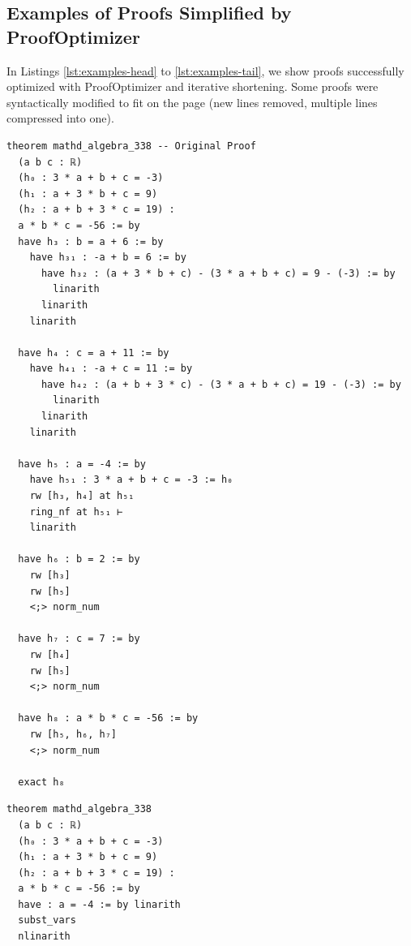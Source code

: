 \vfill


\newpage
\subsection{Examples of Proofs Simplified by ProofOptimizer}

In Listings \ref{lst:examples-head} to \ref{lst:examples-tail}, we show proofs successfully optimized with ProofOptimizer and iterative shortening. Some proofs were syntactically modified to fit on the page (new lines removed, multiple lines compressed into one).

\begin{tcolorbox}[colback=lightblue, boxrule=0pt, arc=5pt, outer arc=5pt, after skip=10pt plus 2pt]
\begin{minipage}[t]{0.48\textwidth}
\begin{lstlisting}[caption={Original Proof (Length 214)},label={lst:examples-head}, language=lean, breaklines=true, style=mystyle]
theorem mathd_algebra_338 -- Original Proof
  (a b c : ℝ)
  (h₀ : 3 * a + b + c = -3)
  (h₁ : a + 3 * b + c = 9)
  (h₂ : a + b + 3 * c = 19) :
  a * b * c = -56 := by
  have h₃ : b = a + 6 := by
    have h₃₁ : -a + b = 6 := by
      have h₃₂ : (a + 3 * b + c) - (3 * a + b + c) = 9 - (-3) := by
        linarith
      linarith
    linarith

  have h₄ : c = a + 11 := by
    have h₄₁ : -a + c = 11 := by
      have h₄₂ : (a + b + 3 * c) - (3 * a + b + c) = 19 - (-3) := by
        linarith
      linarith
    linarith

  have h₅ : a = -4 := by
    have h₅₁ : 3 * a + b + c = -3 := h₀
    rw [h₃, h₄] at h₅₁
    ring_nf at h₅₁ ⊢
    linarith

  have h₆ : b = 2 := by
    rw [h₃]
    rw [h₅]
    <;> norm_num

  have h₇ : c = 7 := by
    rw [h₄]
    rw [h₅]
    <;> norm_num

  have h₈ : a * b * c = -56 := by
    rw [h₅, h₆, h₇]
    <;> norm_num

  exact h₈
\end{lstlisting}
\end{minipage}\hfill
\begin{minipage}[t]{0.48\textwidth}
\begin{lstlisting}[caption={Simplified Proof (Length 11)}, language=lean, breaklines=true, style=mystyle]
theorem mathd_algebra_338
  (a b c : ℝ)
  (h₀ : 3 * a + b + c = -3)
  (h₁ : a + 3 * b + c = 9)
  (h₂ : a + b + 3 * c = 19) :
  a * b * c = -56 := by
  have : a = -4 := by linarith
  subst_vars
  nlinarith
\end{lstlisting}
\end{minipage}
\end{tcolorbox}

